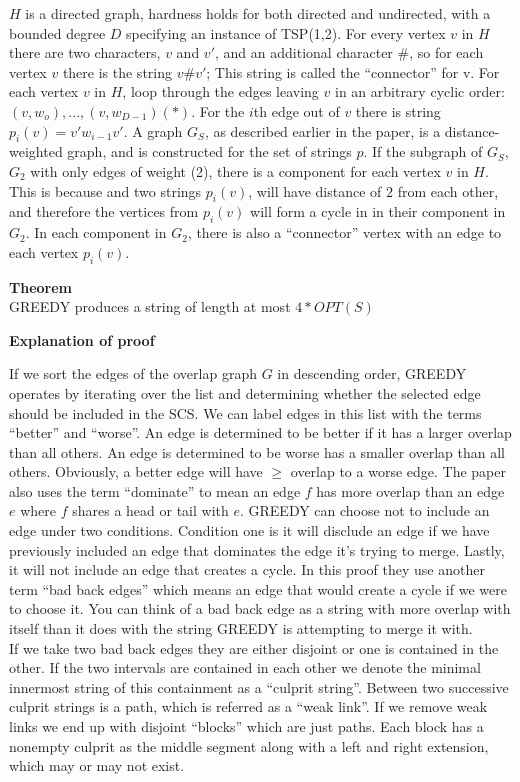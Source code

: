 \documentclass[letterpaper,11pt,titlepage]{article}
\begin{document}
$H$ is a directed graph, hardness holds for both directed and undirected, with a bounded degree $D$ specifying an instance of TSP(1,2).  For every vertex $v$ in $H$ there are two characters, $v$ and $v'$, and an additional character $\#$, so for each vertex $v$ there is the string $v\#v'$; This string is called the ``connector'' for v.  For each vertex $v$ in $H$, loop through the edges leaving $v$ in an arbitrary cyclic order: $(v, w_o),...,(v,w_{D-1})(*)$.  For the $i$th edge out of $v$ there is string $p_i(v) = v'w_{i-1}v'$.  A graph $G_S$, as described earlier in the paper, is a distance-weighted graph, and is constructed for the set of strings $p$.  If the subgraph of $G_S$, $G_2$ with only edges of weight (2), there is a component for each vertex $v$ in $H$.  This is because and two strings $p_i(v)$, will have distance of $2$ from each other, and therefore the vertices from $p_i(v)$ will form a cycle in in their component in $G_2$.  In each component in $G_2$, there is also a ``connector'' vertex with an edge to each vertex $p_i(v)$.  




\textbf{Theorem}\\
GREEDY produces a string of length at most $4 * OPT(S)$

\textbf{Explanation of proof}

If we sort the edges of the overlap graph $G$ in descending order, GREEDY operates by iterating over the list and determining whether the selected edge should be included in the SCS. We can label edges in this list with the terms ``better'' and ``worse''. An edge is determined to be better if it has a larger overlap than all others. An edge is determined to be worse has a smaller overlap than all others. Obviously, a better edge will have $\geq$ overlap to a worse edge. The paper also uses the term ``dominate'' to mean an edge $f$ has more overlap than an edge $e$ where $f$ shares a head or tail with $e$. GREEDY can choose not to include an edge under two conditions. Condition one is it will disclude an edge if we have previously included an edge that dominates the edge it's trying to merge. Lastly, it will not include an edge that creates a cycle. In this proof they use another term ``bad back edges'' which means an edge that would create a cycle if we were to choose it. You can think of a bad back edge as a string with more overlap with itself than it does with the string GREEDY is attempting to merge it with.\\

If we take two bad back edges they are either disjoint or one is contained in the other. If the two intervals are contained in each other we denote the minimal innermost string of this containment as a ``culprit string''. Between two successive culprit strings is a path, which is referred as a ``weak link''. If we remove weak links we end up with disjoint ``blocks'' which are just paths. Each block has a nonempty culprit as the middle segment along with a left and right extension, which may or may not exist.
\end{document}
